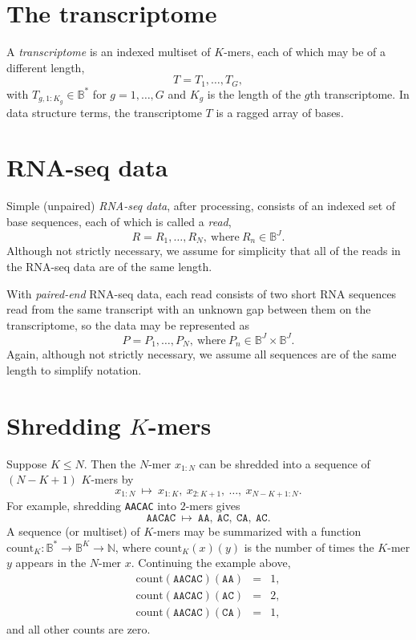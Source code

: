 \documentclass[11pt]{article}
\begin{document}
\section{The transcriptome}

A \emph{transcriptome} is an indexed multiset of $K$-mers, each of
which may be of a different length,
\[
  T = T_{1}, \ldots, T_{G},
\]
with $T_{g, 1:K_g} \in \mathbb{B}^*$ for $g =1, \ldots, G$ and $K_g$ is the length of the $g$th transcriptome.  In data structure terms, the
transcriptome $T$ is a ragged array of bases.


\section{RNA-seq data}

Simple (unpaired) \emph{RNA-seq data}, after processing, consists of an indexed set of base
sequences, each of which is called a \emph{read},
\[
  R = R_1, \ldots, R_N, \ \textrm{where} \ R_n \in \mathbb{B}^J.
\]
Although not strictly necessary, we assume for simplicity that all of
the reads in the RNA-seq data are of the same length.

With \emph{paired-end} RNA-seq data, each read consists of two short RNA
sequences read from the same transcript with an unknown gap between
them on the transcriptome, so the data may be represented as
\[
  P = P_1, \ldots, P_N, \ \textrm{where} \ P_n \in \mathbb{B}^J \times
  \mathbb{B}^J.
\]
Again, although not strictly necessary, we assume all sequences are of
the same length to simplify notation.


\section{Shredding $K$-mers}

Suppose $K \leq N$.  Then the $N$-mer $x_{1:N}$ can be shredded into
a sequence of $(N - K + 1)$ $K$-mers by
\[
  x_{1:N} \ \mapsto \
  x_{1:K}, \ x_{2:K+1}, \ \ldots, \ x_{N-K+1:N}.
\]
For example, shredding   \texttt{AACAC}  into $2$-mers gives
\[
  \texttt{AACAC} \ \mapsto \
  \texttt{AA}, \ \texttt{AC}, \ \texttt{CA}, \ \texttt{AC}.
\]
A sequence (or multiset) of $K$-mers may be summarized with a function
$\textrm{count}_K:\mathbb{B}^* \rightarrow \mathbb{B}^K \rightarrow
\mathbb{N}$, where
$\textrm{count}_K(x)(y)$ is the number of times the $K$-mer
$y$ appears in the $N$-mer $x$.  Continuing the example above,
\begin{eqnarray*}
  \textrm{count}(\texttt{AACAC})(\texttt{AA}) & = & 1,
  \\
  \textrm{count}(\texttt{AACAC})(\texttt{AC}) & = & 2,
  \\
  \textrm{count}(\texttt{AACAC})(\texttt{CA}) & = & 1,
\end{eqnarray*}
and all other counts are zero.
\end{document}
